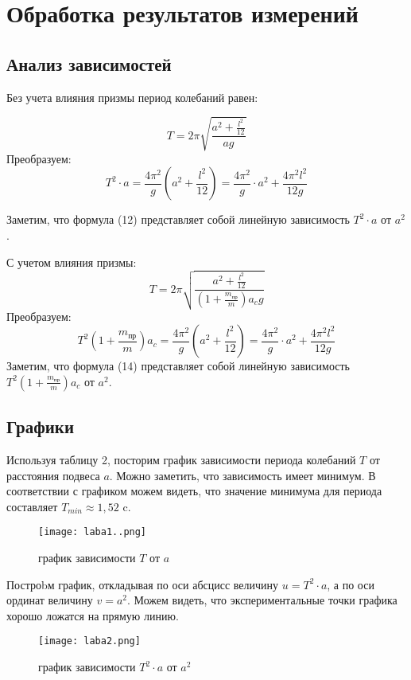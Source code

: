 \documentclass[a5paper, 11pt]{article}
\begin{document}
\section{Обработка результатов измерений}
\subsection{Анализ зависимостей}
Без учета влияния призмы период колебаний равен:

\begin{equation}
	T=2\pi\sqrt{\frac{a^2+\frac{l^2}{12}}{ag}}
\end{equation}
Преобразуем:
\begin{equation}
	T^2 \cdot a=\frac{4\pi^2}{g}(a^2+\frac{l^2}{12})=\frac{4\pi^2}{g}\cdot a^2+\frac{4\pi^{2}l^2}{12g}
\end{equation}

Заметим, что формула (12) представляет собой линейную зависимость $T^2 \cdot a$ от $a^2$.


С учетом влияния призмы:
\begin{equation}\label{period2}
	T=2\pi\sqrt{\frac{a^2+\frac{l^2}{12}}{(1 + \frac{m_\text{пр}}{m})a_{c}g}}
\end{equation}
Преобразуем:
\begin{equation}
	T^2 (1 + \frac{m_\text{пр}}{m}) a_{c}=\frac{4\pi^2}{g}(a^2+\frac{l^2}{12})=\frac{4\pi^2}{g}\cdot a^2+\frac{4\pi^{2}l^2}{12g}
\end{equation}
Заметим, что формула (14) представляет собой линейную зависимость $T^2 (1 + \frac{m_\text{пр}}{m}) a_{c}$ от $a^2$.

\subsection{Графики}

Используя таблицу 2, посторим график зависимости периода колебаний $T$ от расстояния
подвеса $a$. Можно заметить, что зависимость имеет минимум. В соответствии с графиком можем видеть, что значение минимума для периода составляет $T_{min} \approx 1,52$ c.

\begin{figure}[H]
	
	\centering
	\texttt{[image: laba1..png]}
	\caption{график зависимости $T$ от $a$}
	
\end{figure}

\newpage
Построbм график, откладывая по оси абсцисс величину $u = T^2 \cdot a$, а по оси ординат величину $v = a^2$. Можем видеть, что экспериментальные точки графика хорошо ложатся на прямую линию.
\begin{figure}[H]
	
	\centering
	\texttt{[image: laba2.png]}
	\caption{график зависимости $T^2 \cdot a$ от $a^2$}
	
\end{figure}
\end{document}
